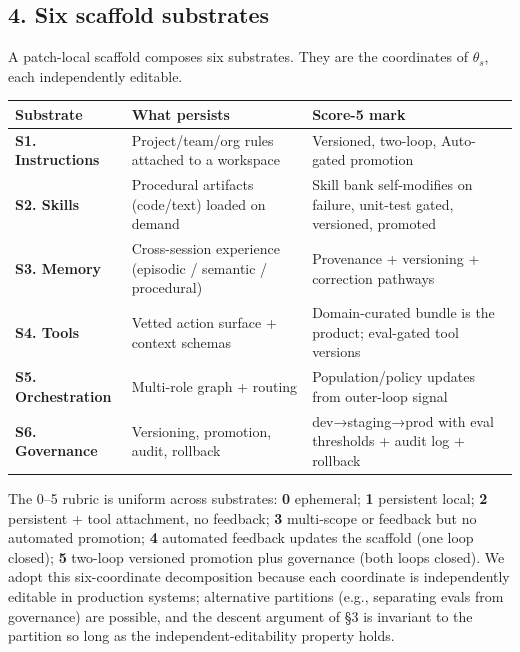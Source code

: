\subsection{4. Six scaffold substrates}\label{six-scaffold-substrates}

A patch-local scaffold composes six substrates. They are the coordinates
of \(\theta_s\), each independently editable.

{\def\LTcaptype{none} %
\begin{longtable}[]{@{}
  >{\raggedright\arraybackslash}p{}
  >{\raggedright\arraybackslash}p{}
  >{\raggedright\arraybackslash}p{}@{}}
\toprule\noalign{}
\begin{minipage}[b]{\linewidth}\raggedright
Substrate
\end{minipage} & \begin{minipage}[b]{\linewidth}\raggedright
What persists
\end{minipage} & \begin{minipage}[b]{\linewidth}\raggedright
Score-5 mark
\end{minipage} \\
\midrule\noalign{}
\endhead
\bottomrule\noalign{}
\endlastfoot
\textbf{S1. Instructions} & Project/team/org rules attached to a
workspace & Versioned, two-loop, Auto-gated promotion \\
\textbf{S2. Skills} & Procedural artifacts (code/text) loaded on demand
& Skill bank self-modifies on failure, unit-test gated, versioned,
promoted \\
\textbf{S3. Memory} & Cross-session experience (episodic / semantic /
procedural) & Provenance + versioning + correction pathways \\
\textbf{S4. Tools} & Vetted action surface + context schemas &
Domain-curated bundle is the product; eval-gated tool versions \\
\textbf{S5. Orchestration} & Multi-role graph + routing &
Population/policy updates from outer-loop signal \\
\textbf{S6. Governance} & Versioning, promotion, audit, rollback &
dev→staging→prod with eval thresholds + audit log + rollback \\
\end{longtable}
}

The 0--5 rubric is uniform across substrates: \textbf{0} ephemeral;
\textbf{1} persistent local; \textbf{2} persistent + tool attachment, no
feedback; \textbf{3} multi-scope or feedback but no automated promotion;
\textbf{4} automated feedback updates the scaffold (one loop closed);
\textbf{5} two-loop versioned promotion plus governance (both loops
closed). We adopt this six-coordinate decomposition because each
coordinate is independently editable in production systems; alternative
partitions (e.g., separating evals from governance) are possible, and
the descent argument of §3 is invariant to the partition so long as the
independent-editability property holds.

